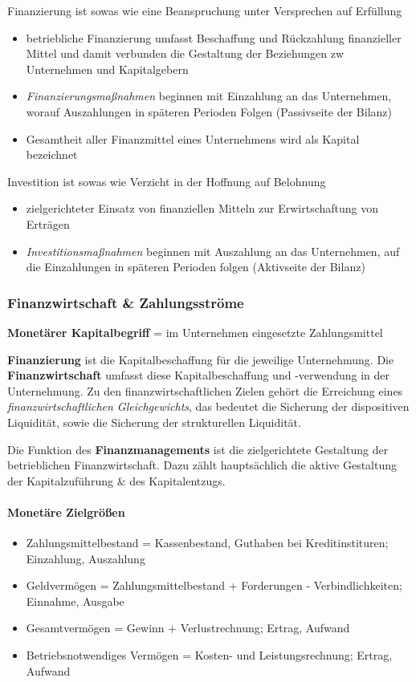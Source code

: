 \documentclass[11pt]{article}
\begin{document}
Finanzierung ist sowas wie eine Beanspruchung unter Versprechen auf Erfüllung
\begin{itemize}
\item betriebliche Finanzierung umfasst Beschaffung und Rückzahlung finanzieller Mittel und damit verbunden die Gestaltung der Beziehungen zw Unternehmen und Kapitalgebern
\item \emph{Finanzierungsmaßnahmen} beginnen mit Einzahlung an das Unternehmen, worauf Auszahlungen in späteren Perioden Folgen (Passivseite der Bilanz)
\item Gesamtheit aller Finanzmittel eines Unternehmens wird als Kapital bezeichnet
\end{itemize}

Investition ist sowas wie Verzicht in der Hoffnung auf Belohnung
\begin{itemize}
\item zielgerichteter Einsatz von finanziellen Mitteln zur Erwirtschaftung von Erträgen
\item \emph{Investitionsmaßnahmen} beginnen mit Auszahlung an das Unternehmen, auf die Einzahlungen in späteren Perioden folgen (Aktivseite der Bilanz)
\end{itemize}

\subsubsection{Finanzwirtschaft \& Zahlungsströme}
\label{sec:org0c3a73a}
\textbf{Monetärer Kapitalbegriff} = im Unternehmen eingesetzte Zahlungsmittel

\textbf{Finanzierung} ist die Kapitalbeschaffung für die jeweilige Unternehmung. Die \textbf{Finanzwirtschaft} umfasst diese Kapitalbeschaffung und -verwendung in der Unternehmung. Zu den finanzwirtschaftlichen Zielen gehört die Erreichung eines \emph{finanzwirtschaftlichen Gleichgewichts}, das bedeutet die Sicherung der dispositiven Liquidität, sowie die Sicherung der strukturellen Liquidität.

Die Funktion des \textbf{Finanzmanagements} ist die zielgerichtete Gestaltung der betrieblichen Finanzwirtschaft. Dazu zählt hauptsächlich die aktive Gestaltung der Kapitalzuführung \& des Kapitalentzugs.

\paragraph{Monetäre Zielgrößen}
\begin{itemize}
\item Zahlungsmittelbestand = Kassenbestand, Guthaben bei Kreditinstituren; Einzahlung, Auszahlung
\item Geldvermögen = Zahlungsmittelbestand + Forderungen - Verbindlichkeiten; Einnahme, Ausgabe
\item Gesamtvermögen = Gewinn + Verlustrechnung; Ertrag, Aufwand
\item Betriebsnotwendiges Vermögen = Kosten- und Leistungsrechnung; Ertrag, Aufwand
\end{itemize}
\end{document}
